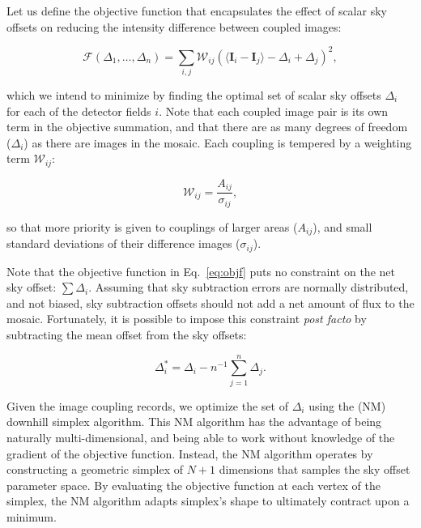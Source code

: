 \documentclass[iop]{emulateapj}
\newcommand{\vect}[1]{\boldsymbol{#1}} %
\newcommand{\Eq}[1]{Eq.~\ref{eq:#1}}  %
\begin{document}
Let us define the objective function that encapsulates the effect of scalar sky offsets on reducing the intensity difference between coupled images:

\begin{equation}
    \mathcal{F} \left(\Delta_1,\ldots,\Delta_n \right) = \sum_{i,j} \mathcal{W}_{ij} \left( \langle \vect{I}_i - \vect{I}_j \rangle - \Delta_i + \Delta_j \right)^2,
    \label{eq:objf}
\end{equation}

\noindent which we intend to minimize by finding the optimal set of scalar sky offsets $\Delta_i$ for each of the detector fields $i$.
Note that each coupled image pair is its own term in the objective summation, and that there are as many degrees of freedom ($\Delta_i$) as there are images in the mosaic.
Each coupling is tempered by a weighting term $\mathcal{W}_{ij}$:

\begin{equation}
    \mathcal{W}_{ij} = \frac{A_{ij}}{\sigma_{ij}},
\end{equation}

\noindent so that more priority is given to couplings of larger areas ($A_{ij}$), and small standard deviations of their difference images ($\sigma_{ij}$).

Note that the objective function in \Eq{objf} puts no constraint on the net sky offset: $\sum \Delta_i$.
Assuming that sky subtraction errors are normally distributed, and not biased, sky subtraction offsets should not add a net amount of flux to the mosaic.
Fortunately, it is possible to impose this constraint \textit{post facto} by subtracting the mean offset from the sky offsets:

\begin{equation}
    \Delta_i^* = \Delta_i - n^{-1}\sum_{j=1}^n \Delta_j.
    \label{eq:netzero}
\end{equation}

Given the image coupling records, we optimize the set of $\Delta_i$ using the \cite{Nelder:1965} (NM) downhill simplex algorithm.
This NM algorithm has the advantage of being naturally multi-dimensional, and being able to work without knowledge of the gradient of the objective function.
Instead, the NM algorithm operates by constructing a geometric simplex of $N+1$ dimensions that samples the sky offset parameter space.
By evaluating the objective function at each vertex of the simplex, the NM algorithm adapts simplex's shape to ultimately contract upon a minimum.
\end{document}
